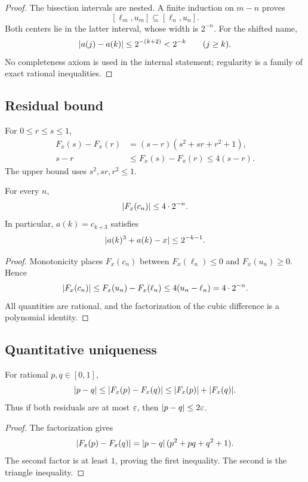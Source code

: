 \begin{proof}
The bisection intervals are nested.  A finite induction on \(m-n\) proves
\[
       [\ell_m,u_m]\subseteq[\ell_n,u_n].
\]
Both centers lie in the latter interval, whose width is \(2^{-n}\).  For the
shifted name,
\[
 \lvert a(j)-a(k)\rvert
 \le 2^{-(k+2)}<2^{-k}
 \qquad(j\ge k).
\]
No completeness axiom is used in the internal statement; regularity is a
family of exact rational inequalities.
\end{proof}

\subsection{Residual bound}

For \(0\le r\le s\le1\),
\[
\begin{aligned}
  F_x(s)-F_x(r)
  &=(s-r)(s^2+sr+r^2+1),\\
  s-r
  &\le F_x(s)-F_x(r)\le4(s-r).
\end{aligned}
\]
The upper bound uses \(s^2,sr,r^2\le1\).

\begin{theorem}
For every \(n\),
\[
       \lvert F_x(c_n)\rvert\le 4\cdot2^{-n}.
\]
In particular, \(a(k)=c_{k+3}\) satisfies
\[
       \lvert a(k)^3+a(k)-x\rvert\le2^{-k-1}.
\]
\end{theorem}

\begin{proof}
Monotonicity places \(F_x(c_n)\) between
\(F_x(\ell_n)\le0\) and \(F_x(u_n)\ge0\).  Hence
\[
 \lvert F_x(c_n)\rvert
 \le F_x(u_n)-F_x(\ell_n)
 \le4(u_n-\ell_n)=4\cdot2^{-n}.
\]
All quantities are rational, and the factorization of the cubic difference
is a polynomial identity.
\end{proof}

\subsection{Quantitative uniqueness}

\begin{lemma}
For rational \(p,q\in[0,1]\),
\[
       \lvert p-q\rvert\le \lvert F_x(p)-F_x(q)\rvert
       \le \lvert F_x(p)\rvert+\lvert F_x(q)\rvert.
\]
Thus if both residuals are at most \(\varepsilon\), then
\(\lvert p-q\rvert\le2\varepsilon\).
\end{lemma}

\begin{proof}
The factorization gives
\[
 \lvert F_x(p)-F_x(q)\rvert
 =\lvert p-q\rvert\,(p^2+pq+q^2+1).
\]
The second factor is at least \(1\), proving the first inequality.  The
second is the triangle inequality.
\end{proof}

